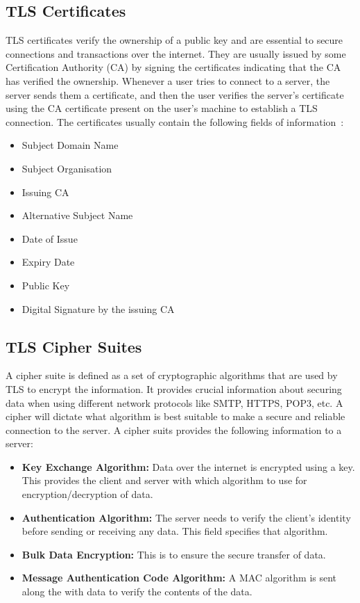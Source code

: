\subsection{TLS Certificates}
TLS certificates verify the ownership of a public key and are essential to secure connections and transactions over the internet. 
They are usually issued by some Certification Authority (CA) by signing the certificates indicating that the CA has verified the ownership. 
Whenever a user tries to connect to a server, the server sends them a certificate, and then the user verifies the server's certificate using the CA certificate 
present on the user's machine to establish a TLS connection. The certificates usually contain the following fields of information~\cite{rfc5280}:
\begin{itemize}
    \item Subject Domain Name
    \item Subject Organisation
    \item Issuing CA
    \item Alternative Subject Name 
    \item Date of Issue 
    \item Expiry Date 
    \item Public Key 
    \item Digital Signature by the issuing CA
\end{itemize}

\subsection{TLS Cipher Suites}
A cipher suite is defined as a set of cryptographic algorithms that are used by TLS to encrypt the information. It provides crucial 
information about securing data when using different network protocols like SMTP, HTTPS, POP3, etc. A cipher will dictate what algorithm is 
best suitable to make a secure and reliable connection to the server. A cipher suits provides the following information to a server:
\begin{itemize}
    \item \textbf{Key Exchange Algorithm:} Data over the internet is encrypted using a key. This provides the client and server with which algorithm to use for encryption/decryption of data.
    \item \textbf{Authentication Algorithm:} The server needs to verify the client's identity before sending or receiving any data. This field specifies that algorithm.
    \item \textbf{Bulk Data Encryption:} This is to ensure the secure transfer of data. 
    \item \textbf{Message Authentication Code Algorithm:} A MAC algorithm is sent along the with data to verify the contents of the data. 
\end{itemize}

